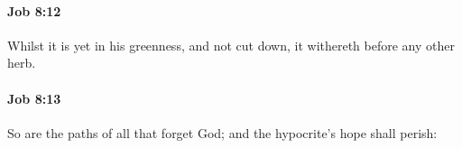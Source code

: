 		\paragraph{Job 8:12} %
			\label{JOB-8-12}

			Whilst it is yet in his greenness, and not cut down, it withereth before any other herb.


		\paragraph{Job 8:13} %
			\label{JOB-8-13}

			So are the paths of all that forget God; and the hypocrite’s hope shall perish:


